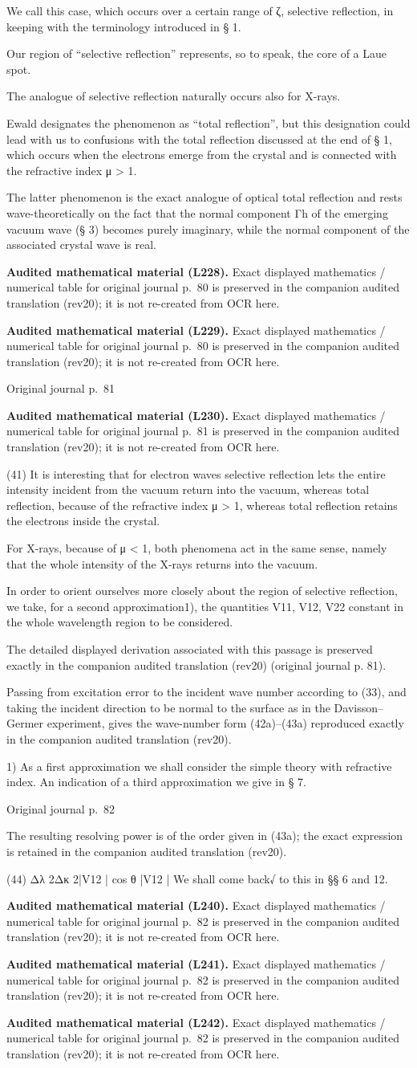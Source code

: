 \documentclass[10pt]{article}
\newcommand{\origpage}[1]{\par\medskip\noindent\hfill{\small\color{notegray}Original journal p.~#1}\hfill\mbox{}\par\smallskip}
\newcommand{\mathref}[2]{\par\smallskip\noindent\colorbox{gray!8}{\parbox{0.95\linewidth}{\small\color{notegray}\textbf{Audited mathematical material (L#1).} Exact displayed mathematics / numerical table for original journal p.~#2 is preserved in the companion audited translation (rev20); it is not re-created from OCR here.}}\par\smallskip}
\begin{document}
We call this case, which occurs over a certain range of ζ, selective reflection, in keeping with the terminology introduced in § 1.\par
Our region of “selective reflection” represents, so to speak, the core of a Laue spot.\par
The analogue of selective reflection naturally occurs also for X-rays.\par
Ewald designates the phenomenon as “total reflection”, but this designation could lead with us to confusions with the total reflection discussed at the end of § 1, which occurs when the electrons emerge from the crystal and is connected with the refractive index μ > 1.\par
The latter phenomenon is the exact analogue of optical total reflection and rests wave-theoretically on the fact that the normal component Γh of the emerging vacuum wave (§ 3) becomes purely imaginary, while the normal component of the associated crystal wave is real.\par
\mathref{228}{80}
\mathref{229}{80}
\origpage{81}
\mathref{230}{81}
(41) It is interesting that for electron waves selective reflection lets the entire intensity incident from the vacuum return into the vacuum, whereas total reflection, because of the refractive index μ > 1, whereas total reflection retains the electrons inside the crystal.\par
For X-rays, because of μ < 1, both phenomena act in the same sense, namely that the whole intensity of the X-rays returns into the vacuum.\par
In order to orient ourselves more closely about the region of selective reflection, we take, for a second approximation1), the quantities V11, V12, V22 constant in the whole wavelength region to be considered.\par
The detailed displayed derivation associated with this passage is preserved exactly in the companion audited translation (rev20) (original journal p. 81).\par
Passing from excitation error to the incident wave number according to (33), and taking the incident direction to be normal to the surface as in the Davisson–Germer experiment, gives the wave-number form (42a)–(43a) reproduced exactly in the companion audited translation (rev20).\par
\noindent\footnotesize 1) As a first approximation we shall consider the simple theory with refractive index. An indication of a third approximation we give in § 7.\par\normalsize
\origpage{82}
The resulting resolving power is of the order given in (43a); the exact expression is retained in the companion audited translation (rev20).\par
(44) Δλ 2Δκ 2|V12 | cos θ |V12 | We shall come back√ to this in §§ 6 and 12.\par
\mathref{240}{82}
\mathref{241}{82}
\mathref{242}{82}
\end{document}
